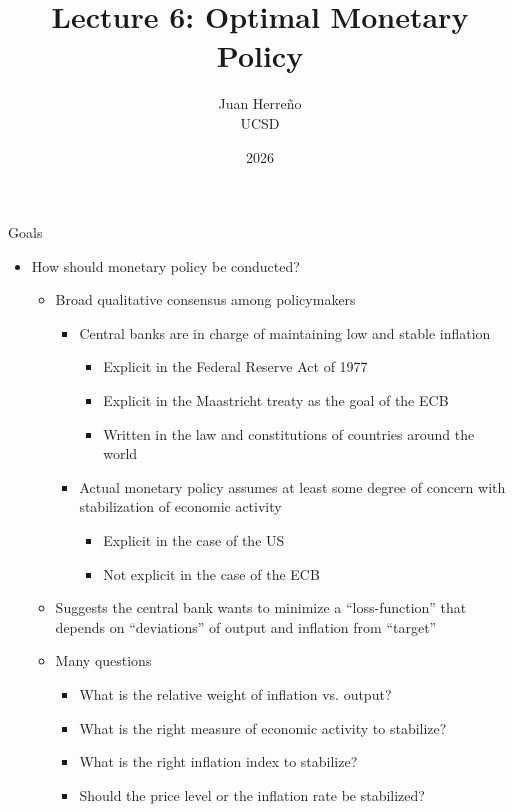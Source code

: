 \documentclass[11pt,aspectratio=169,xcolor={dvipsnames},hyperref={pdftex,pdfpagemode=UseNone,hidelinks,pdfdisplaydoctitle=true},usepdftitle=false]{beamer}
\title{Lecture 6: Optimal Monetary Policy}
\author{Juan Herre\~{n}o\\UCSD}
\date{2026}
\begin{document}
\maketitle


\begin{frame}{Goals}
\begin{itemize}
\item How should monetary policy be conducted?
\begin{itemize}
\item Broad qualitative consensus among policymakers
\begin{itemize}
\item Central banks are in charge of maintaining low and stable inflation
\begin{itemize}
\item Explicit in the Federal Reserve Act of 1977
\item Explicit in the Maastricht treaty as the goal of the ECB
\item Written in the law and constitutions of countries around the world
\end{itemize}
\item Actual monetary policy assumes at least some degree of concern with stabilization of economic activity
\begin{itemize}
\item Explicit in the case of the US
\item Not explicit in the case of the ECB
\end{itemize}
\end{itemize}
\item Suggests the central bank wants to minimize a ``loss-function'' that depends on ``deviations'' of output and inflation from ``target''
\item Many questions
\begin{itemize}
\item What is the relative weight of inflation vs. output?
\item What is the right measure of economic activity to stabilize?
\item What is the right inflation index to stabilize?
\item Should the price level or the inflation rate be stabilized?
\end{itemize}
\end{itemize}
\end{itemize}
\end{frame}
\end{document}
